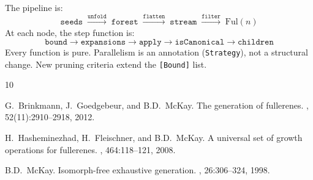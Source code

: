 \documentclass[11pt,a4paper]{article}
\theoremstyle{definition}
\newcommand{\Ful}{\mathrm{Ful}}
\begin{document}
\noindent
The pipeline is:
\[
  \texttt{seeds}
  \;\xrightarrow{\texttt{unfold}}\;
  \texttt{forest}
  \;\xrightarrow{\texttt{flatten}}\;
  \texttt{stream}
  \;\xrightarrow{\texttt{filter}}\;
  \Ful(n)
\]
At each node, the step function is:
\[
  \texttt{bound} \to \texttt{expansions} \to \texttt{apply}
  \to \texttt{isCanonical} \to \texttt{children}
\]
Every function is pure.  Parallelism is an annotation
(\texttt{Strategy}), not a structural change.  New pruning criteria
extend the \texttt{[Bound]} list.

\begin{thebibliography}{10}

G.~Brinkmann, J.~Goedgebeur, and B.D.~McKay.
\newblock The generation of fullerenes.
, 52(11):2910--2918, 2012.

H.~Hasheminezhad, H.~Fleischner, and B.D.~McKay.
\newblock A universal set of growth operations for fullerenes.
, 464:118--121, 2008.

B.D.~McKay.
\newblock Isomorph-free exhaustive generation.
, 26:306--324, 1998.

\end{thebibliography}
\end{document}
